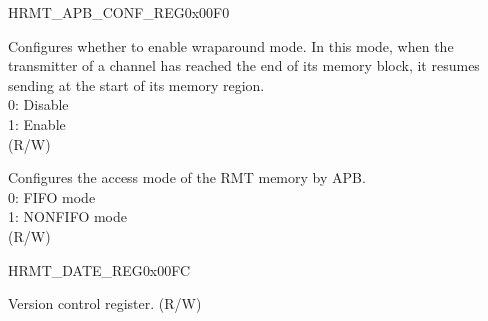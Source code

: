 \begin{register}{H}{RMT\_APB\_CONF\_REG}{0x00F0}\label{regdesc:RMTAPBCONFREG}
%
%
\regnewline%
\begin{regdesc}\begin{reglist}
\item [RMT\_MEM\_TX\_WRAP\_EN] Configures whether to enable wraparound mode. In this mode, when the transmitter of a channel has reached the end of its memory block, it resumes sending at the start of its memory region.\\
0: Disable\\
1: Enable\\ (R/W)
\item [RMT\_APB\_FIFO\_MASK] Configures the access mode of the RMT memory by APB.\\
0: FIFO mode\\
1: NONFIFO mode\\ (R/W)
\end{reglist}\end{regdesc}
\end{register}

\begin{register}{H}{RMT\_DATE\_REG}{0x00FC}\label{regdesc:RMTDATEREG}
%
\regnewline%
\begin{regdesc}\begin{reglist}
\item [RMT\_DATE] Version control register. (R/W)
\end{reglist}\end{regdesc}
\end{register}
